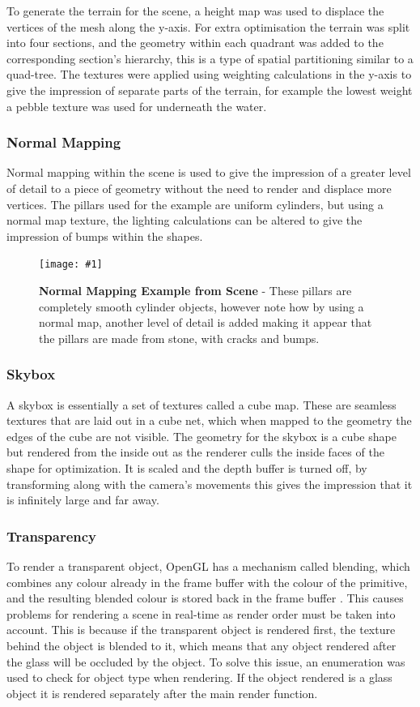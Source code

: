 \documentclass[conference]{acmsiggraph}
\newcommand{\figuremacroW}[4]{
\begin{figure}[h] %
	\centering
	\texttt{[image: \#1]}
	\caption[#2]{\textbf{#2} - #3}
	\label{fig:#1}
\end{figure}
}
\begin{document}
To generate the terrain for the scene, a height map was used to displace the vertices of the mesh along the y-axis. For extra optimisation the terrain was split into four sections, and the geometry within each quadrant was added to the corresponding section's hierarchy, this is a type of spatial partitioning similar to a quad-tree. The textures were applied using weighting calculations in the y-axis to give the impression of separate parts of the terrain, for example the lowest weight a pebble texture was used for underneath the water.

	
\subsubsection{Normal Mapping}
Normal mapping within the scene is used to give the impression of a greater level of detail to a piece of geometry without the need to render and displace more vertices. The pillars used for the example are uniform cylinders, but using a normal map texture, the lighting calculations can be altered to give the impression of bumps within the shapes.  

\figuremacroW
{normalMap}
{Normal Mapping Example from Scene}
{These pillars are completely smooth cylinder objects, however note how by using a normal map, another level of detail is added making it appear that the pillars are made from stone, with cracks and bumps.}
{1.0}
	
\subsubsection{Skybox}
A skybox is essentially a set of textures called a cube map. These are seamless textures that are laid out in a cube net, which when mapped to the geometry the edges of the cube are not visible. The geometry for the skybox is a cube shape but rendered from the inside out as the renderer culls the inside faces of the shape for optimization. It is scaled and the depth buffer is turned off, by transforming along with the camera's movements this gives the impression that it is infinitely large and far away.
	
\subsubsection{Transparency}
	
To render a transparent object, OpenGL has a mechanism called blending, which combines any colour already in the frame buffer with the colour of the primitive, and the resulting blended colour is stored back in the frame buffer \cite{openGLBlend}. This causes problems for rendering a scene in real-time as render order must be taken into account. This is because if the transparent object is rendered first, the texture behind the object is blended to it, which means that any object rendered after the glass will be occluded by the object.
To solve this issue, an enumeration was used to check for object type when rendering. If the object rendered is a glass object it is rendered separately after the main render function.
	
\end{document}
